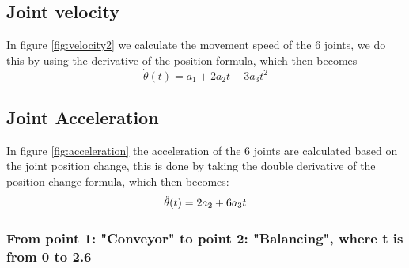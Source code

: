 \subsection{Joint velocity}
In figure \ref{fig:velocity2} we calculate the movement speed of the 6 joints, we do this by using the derivative of the position formula, which then becomes
\begin{equation}
\Dot{\theta}(t)=a_1+2a_2t+3a_3t^2
\end{equation}

\subsection{Joint Acceleration}
In figure \ref{fig:acceleration} the acceleration of the 6 joints are calculated based on the joint position change, this is done by taking the double derivative of the position change formula, which then becomes:
\begin{equation}
\Ddot{\theta}(t)=2a_2+6a_3t
\end{equation}

\subsubsection{From point 1: "Conveyor" to point 2: "Balancing", where t is from 0 to 2.6}

